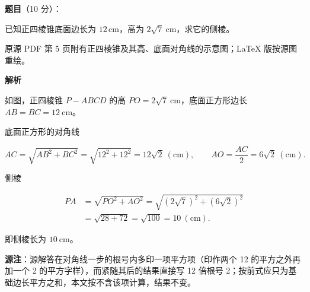 \begin{answer}

\textbf{题目}（10 分）：

已知正四棱锥底面边长为 $12\,\mathrm{cm}$，高为 $2\sqrt{7}\ \mathrm{cm}$，求它的侧棱。

\begin{gktip}
原源 PDF 第 5 页附有正四棱锥及其高、底面对角线的示意图；LaTeX 版按源图重绘。
\end{gktip}
\nopagebreak[4]
\begin{center}\end{center}
\nopagebreak[4]
\textbf{解析}

如图，正四棱锥 $P-ABCD$ 的高 $PO=2\sqrt{7}\ \mathrm{cm}$，底面正方形边长 $AB=BC=12\ \mathrm{cm}$。
\nopagebreak[4]
\begin{center}\end{center}
\nopagebreak[4]
底面正方形的对角线

\nopagebreak[4]
\[
AC=\sqrt{AB^{2}+BC^{2}}=\sqrt{12^{2}+12^{2}}=12\sqrt{2}\ (\mathrm{cm}),
\qquad
AO=\frac{AC}{2}=6\sqrt{2}\ (\mathrm{cm}).
\]

侧棱

\nopagebreak[4]
\[
\begin{aligned}
PA&=\sqrt{PO^{2}+AO^{2}}
=\sqrt{\left(2\sqrt{7}\right)^{2}+\left(6\sqrt{2}\right)^{2}}\\
&=\sqrt{28+72}=\sqrt{100}=10\ (\mathrm{cm}).
\end{aligned}
\]

即侧棱长为 $10\ \mathrm{cm}$。

\begin{gktip}
\textbf{源注}：源解答在对角线一步的根号内多印一项平方项（印作两个 12 的平方之外再加一个 2 的平方字样），而紧随其后的结果直接写 12 倍根号 2；按前式应只为基础边长平方之和，本文按不含该项计算，结果不变。
\end{gktip}


\end{answer}
